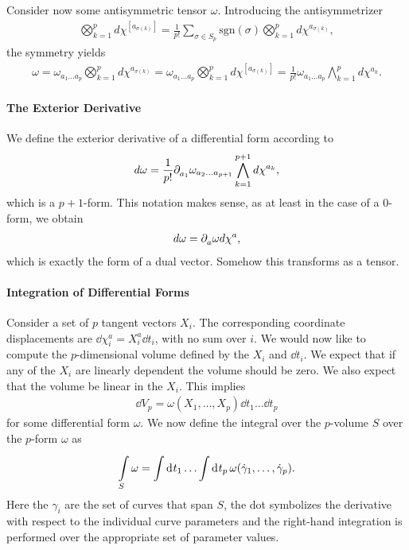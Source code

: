 Consider now some antisymmetric tensor $\omega$. Introducing the antisymmetrizer
\begin{align*}
	\bigotimes_{k = 1}^{p}d\chi^{[a_{\sigma(k)}]} = \frac{1}{p!}\sum\limits_{\sigma\in S_{p}}\text{sgn}(\sigma)\bigotimes_{k = 1}^{p}d\chi^{a_{\sigma(k)}},
\end{align*}
the symmetry yields
\begin{align*}
	\omega = \omega_{a_{1}\dots a_{p}}\bigotimes_{k = 1}^{p}d\chi^{a_{\sigma(k)}} = \omega_{a_{1}\dots a_{p}}\bigotimes_{k = 1}^{p}d\chi^{[a_{\sigma(k)}]} = \frac{1}{p!}\omega_{a_{1}\dots a_{p}}\bigwedge\limits_{k = 1}^{p}d\chi^{a_{k}}.
\end{align*}

\paragraph{The Exterior Derivative}
We define the exterior derivative of a differential form according to
\begin{align*}
	d\omega = \frac{1}{p!}\partial^{}_{a_{1}}\omega_{a_{2}\dots a_{p + 1}}\bigwedge\limits_{k = 1}^{p + 1}d\chi^{a_{k}},
\end{align*}
which is a $p + 1$-form. This notation makes sense, as at least in the case of a $0$-form, we obtain
\begin{align*}
	d\omega = \partial^{}_{a}\omega d\chi^{a},
\end{align*}
which is exactly the form of a dual vector. Somehow this transforms as a tensor.

\paragraph{Integration of Differential Forms}
Consider a set of $p$ tangent vectors $X_{i}$. The corresponding coordinate displacements are $\dd{\chi_{i}^{a}} = X_{i}^{a}\dd{t_{i}}$, with no sum over $i$. We would now like to compute the $p$-dimensional volume defined by the $X_{i}$ and $\dd{t_{i}}$. We expect that if any of the $X_{i}$ are linearly dependent the volume should be zero. We also expect that the volume be linear in the $X_{i}$. This implies
\begin{align*}
	\dd{V_{p}} = \omega(X_{1}, \dots, X_{p})\dd{t_{1}}\dots\dd{t_{p}}
\end{align*}
for some differential form $\omega$. We now define the integral over the $p$-volume $S$ over the $p$-form $\omega$ as
\begin{align*}
	\minteg{S}{\omega} = \integ{}{}{t_{1}}{\dots \integ{}{}{t_{p}}{\omega(\dot{\gamma}_{1},\dots, \dot{\gamma}_{p})}}.
\end{align*}
Here the $\gamma_{i}$ are the set of curves that span $S$, the dot symbolizes the derivative with respect to the individual curve parameters and the right-hand integration is performed over the appropriate set of parameter values.

